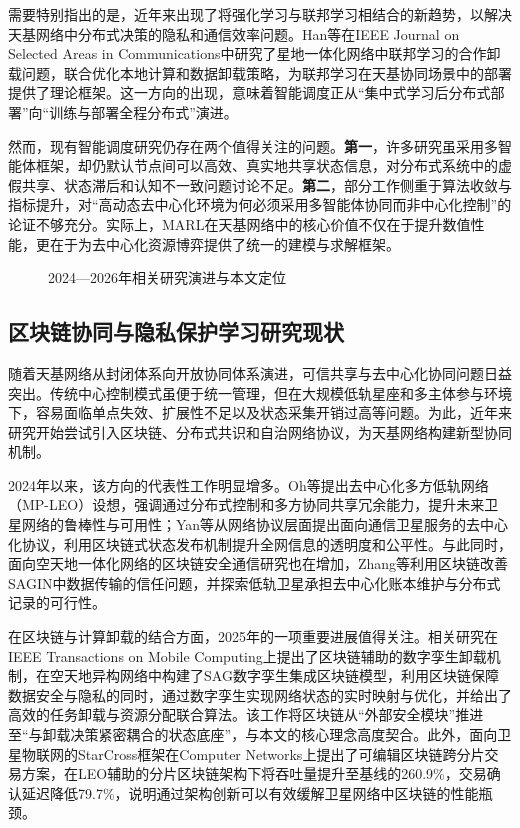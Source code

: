 需要特别指出的是，近年来出现了将强化学习与联邦学习相结合的新趋势，以解决天基网络中分布式决策的隐私和通信效率问题。Han等在IEEE Journal on Selected Areas in Communications中研究了星地一体化网络中联邦学习的合作卸载问题，联合优化本地计算和数据卸载策略，为联邦学习在天基协同场景中的部署提供了理论框架\cite{ref26}。这一方向的出现，意味着智能调度正从“集中式学习后分布式部署”向“训练与部署全程分布式”演进。

然而，现有智能调度研究仍存在两个值得关注的问题。\textbf{第一}，许多研究虽采用多智能体框架，却仍默认节点间可以高效、真实地共享状态信息，对分布式系统中的虚假共享、状态滞后和认知不一致问题讨论不足。\textbf{第二}，部分工作侧重于算法收敛与指标提升，对“高动态去中心化环境为何必须采用多智能体协同而非中心化控制”的论证不够充分。实际上，MARL在天基网络中的核心价值不仅在于提升数值性能，更在于为去中心化资源博弈提供了统一的建模与求解框架。

\begin{figure}[htbp]
  \centering
  \caption{2024—2026年相关研究演进与本文定位}
  \label{fig:evolution}
\end{figure}

\subsection{区块链协同与隐私保护学习研究现状}

随着天基网络从封闭体系向开放协同体系演进，可信共享与去中心化协同问题日益突出。传统中心控制模式虽便于统一管理，但在大规模低轨星座和多主体参与环境下，容易面临单点失效、扩展性不足以及状态采集开销过高等问题。为此，近年来研究开始尝试引入区块链、分布式共识和自治网络协议，为天基网络构建新型协同机制。

2024年以来，该方向的代表性工作明显增多。Oh等提出去中心化多方低轨网络（MP-LEO）设想，强调通过分布式控制和多方协同共享冗余能力，提升未来卫星网络的鲁棒性与可用性\cite{ref6}；Yan等从网络协议层面提出面向通信卫星服务的去中心化协议，利用区块链式状态发布机制提升全网信息的透明度和公平性\cite{ref7}。与此同时，面向空天地一体化网络的区块链安全通信研究也在增加，Zhang等利用区块链改善SAGIN中数据传输的信任问题，并探索低轨卫星承担去中心化账本维护与分布式记录的可行性\cite{ref8}。

在区块链与计算卸载的结合方面，2025年的一项重要进展值得关注。相关研究在IEEE Transactions on Mobile Computing上提出了区块链辅助的数字孪生卸载机制，在空天地异构网络中构建了SAG数字孪生集成区块链模型，利用区块链保障数据安全与隐私的同时，通过数字孪生实现网络状态的实时映射与优化，并给出了高效的任务卸载与资源分配联合算法\cite{ref27}。该工作将区块链从“外部安全模块”推进至“与卸载决策紧密耦合的状态底座”，与本文的核心理念高度契合。此外，面向卫星物联网的StarCross框架在Computer Networks上提出了可编辑区块链跨分片交易方案，在LEO辅助的分片区块链架构下将吞吐量提升至基线的260.9\%，交易确认延迟降低79.7\%，说明通过架构创新可以有效缓解卫星网络中区块链的性能瓶颈\cite{ref28}。

